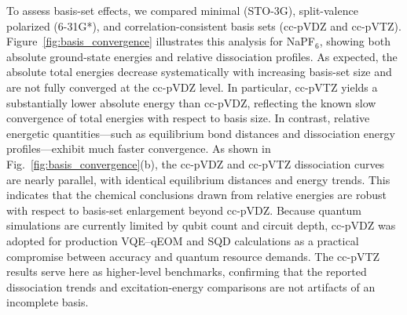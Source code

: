 \documentclass[num-refs]{wiley-article}
\begin{document}
To assess basis-set effects, we compared minimal (STO-3G), split-valence polarized (6-31G*), and correlation-consistent basis sets (cc-pVDZ and cc-pVTZ). Figure~\ref{fig:basis_convergence} illustrates this analysis for NaPF$_6$, showing both absolute ground-state energies and relative dissociation profiles. As expected, the absolute total energies decrease systematically with increasing basis-set size and are not fully converged at the cc-pVDZ level. In particular, cc-pVTZ yields a substantially lower absolute energy than cc-pVDZ, reflecting the known slow convergence of total energies with respect to basis size. %
In contrast, relative energetic quantities—such as equilibrium bond distances and dissociation energy profiles—exhibit much faster convergence. As shown in Fig.~\ref{fig:basis_convergence}(b), the cc-pVDZ and cc-pVTZ dissociation curves are nearly parallel, with identical equilibrium distances and energy trends. This indicates that the chemical conclusions drawn from relative energies are robust with respect to basis-set enlargement beyond cc-pVDZ. Because quantum simulations are currently limited by qubit count and circuit depth, cc-pVDZ was adopted for production VQE–qEOM and SQD calculations as a practical compromise between accuracy and quantum resource demands. The cc-pVTZ results serve here as higher-level benchmarks, confirming that the reported dissociation trends and excitation-energy comparisons are not artifacts of an incomplete basis.


\end{document}
